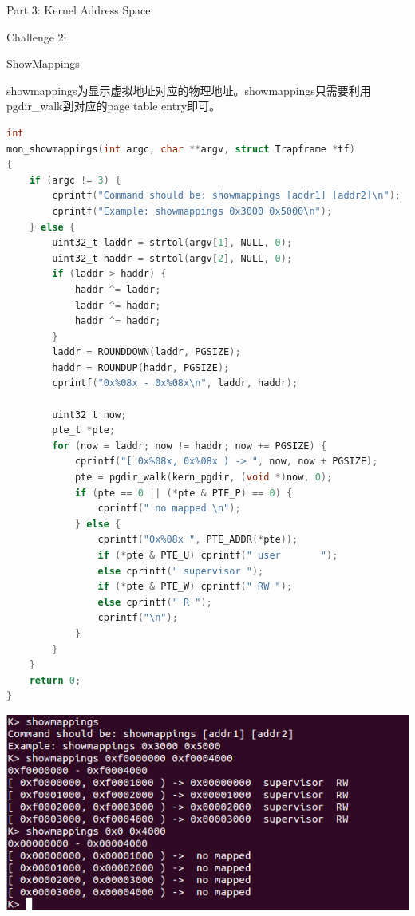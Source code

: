\documentclass[GBK,winfonts,a4paper,10pt]{ctexart}
\begin{document}
\begin{section}{Part 3: Kernel Address Space}
\begin{subsection}{Challenge 2:}
\begin{subsubsection}{ ShowMappings }
\par
showmappings为显示虚拟地址对应的物理地址。showmappings只需要利用pgdir\_walk到对应的page table entry即可。
\begin{lstlisting}[language=C]
int
mon_showmappings(int argc, char **argv, struct Trapframe *tf)
{
    if (argc != 3) {
        cprintf("Command should be: showmappings [addr1] [addr2]\n");
        cprintf("Example: showmappings 0x3000 0x5000\n");
    } else {
        uint32_t laddr = strtol(argv[1], NULL, 0);
        uint32_t haddr = strtol(argv[2], NULL, 0);
        if (laddr > haddr) {
            haddr ^= laddr;
            laddr ^= haddr;
            haddr ^= haddr;
        }
        laddr = ROUNDDOWN(laddr, PGSIZE);
        haddr = ROUNDUP(haddr, PGSIZE);
        cprintf("0x%08x - 0x%08x\n", laddr, haddr);
        
        uint32_t now;
        pte_t *pte;
        for (now = laddr; now != haddr; now += PGSIZE) {
            cprintf("[ 0x%08x, 0x%08x ) -> ", now, now + PGSIZE); 
            pte = pgdir_walk(kern_pgdir, (void *)now, 0);
            if (pte == 0 || (*pte & PTE_P) == 0) {
                cprintf(" no mapped \n");
            } else {
                cprintf("0x%08x ", PTE_ADDR(*pte));
                if (*pte & PTE_U) cprintf(" user       ");
                else cprintf(" supervisor ");
                if (*pte & PTE_W) cprintf(" RW ");
                else cprintf(" R ");
                cprintf("\n");
            }
        }
    }
    return 0;
}
\end{lstlisting}
\includegraphics[scale=0.5]{showmappings.png}
\end{subsubsection}


\end{subsection}
\end{section}
\end{document}
